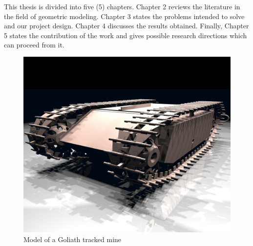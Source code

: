 This thesis is divided into five (5) chapters. Chapter 2 reviews the literature in the field of geometric modeling. Chapter 3 states the problems  intended to solve and our project design. Chapter 4 discusses the results obtained. Finally, Chapter 5 states the contribution of the work and gives possible research directions which can proceed from it.

\begin{figure}[htbp]
\centering
\includegraphics[trim=1cm 2cm 3cm 4cm, clip=true, totalheight=0.5\textheight]{Figures/Goliath.png}
\caption[Model of a Goliath tracked mine]{Model of a Goliath tracked mine}
\label{Goliath}
\end{figure}

